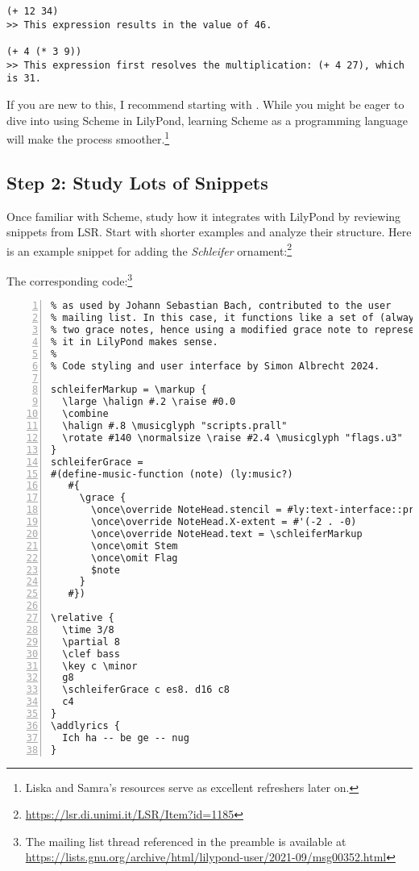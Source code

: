 \begin{Verbatim}
(+ 12 34)    
>> This expression results in the value of 46.

(+ 4 (* 3 9))
>> This expression first resolves the multiplication: (+ 4 27), which is 31.
\end{Verbatim}

If you are new to this, I recommend starting with \cite{LS0001}. While you might be eager to dive into using Scheme in LilyPond, learning Scheme as a programming language will make the process smoother.\footnote{Liska and Samra’s resources serve as excellent refreshers later on.}

\subsection{Step 2: Study Lots of Snippets}
Once familiar with Scheme, study how it integrates with LilyPond by reviewing snippets from LSR. Start with shorter examples and analyze their structure. Here is an example snippet for adding the \textit{Schleifer} ornament:\footnote{\url{https://lsr.di.unimi.it/LSR/Item?id=1185}}

\hfill \break

The corresponding code:\footnote{The mailing list thread referenced in the preamble is available at \url{https://lists.gnu.org/archive/html/lilypond-user/2021-09/msg00352.html}}
\begin{Verbatim}[numbers=left,xleftmargin=5mm]
% Implementation by Martin Straeten of the Schleifer ornament 
% as used by Johann Sebastian Bach, contributed to the user 
% mailing list. In this case, it functions like a set of (always?)
% two grace notes, hence using a modified grace note to represent 
% it in LilyPond makes sense.
%
% Code styling and user interface by Simon Albrecht 2024.

schleiferMarkup = \markup {
  \large \halign #.2 \raise #0.0
  \combine
  \halign #.8 \musicglyph "scripts.prall"
  \rotate #140 \normalsize \raise #2.4 \musicglyph "flags.u3"
}
schleiferGrace =
#(define-music-function (note) (ly:music?)
   #{
     \grace {
       \once\override NoteHead.stencil = #ly:text-interface::print
       \once\override NoteHead.X-extent = #'(-2 . -0)
       \once\override NoteHead.text = \schleiferMarkup
       \once\omit Stem
       \once\omit Flag
       $note
     }
   #})

\relative {
  \time 3/8
  \partial 8
  \clef bass
  \key c \minor
  g8
  \schleiferGrace c es8. d16 c8
  c4
}
\addlyrics {
  Ich ha -- be ge -- nug
}
\end{Verbatim}

